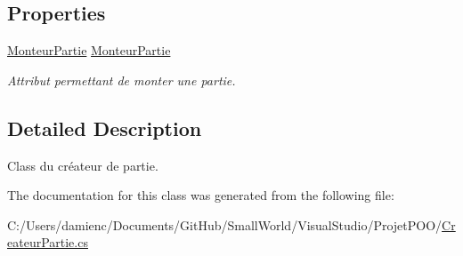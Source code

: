 \subsection*{Properties}
\begin{DoxyCompactItemize}
\item 
\hypertarget{class_small_world_1_1_createur_partie_a9e93618a0b35e91b328df64ba8816164}{\hyperlink{class_small_world_1_1_monteur_partie}{Monteur\-Partie} \hyperlink{class_small_world_1_1_createur_partie_a9e93618a0b35e91b328df64ba8816164}{Monteur\-Partie}}\label{class_small_world_1_1_createur_partie_a9e93618a0b35e91b328df64ba8816164}

\begin{DoxyCompactList}\small\item\em Attribut permettant de monter une partie. \end{DoxyCompactList}\end{DoxyCompactItemize}


\subsection{Detailed Description}
Class du créateur de partie. 

The documentation for this class was generated from the following file\-:\begin{DoxyCompactItemize}
\item 
C\-:/\-Users/damienc/\-Documents/\-Git\-Hub/\-Small\-World/\-Visual\-Studio/\-Projet\-P\-O\-O/\hyperlink{_createur_partie_8cs}{Createur\-Partie.\-cs}\end{DoxyCompactItemize}
